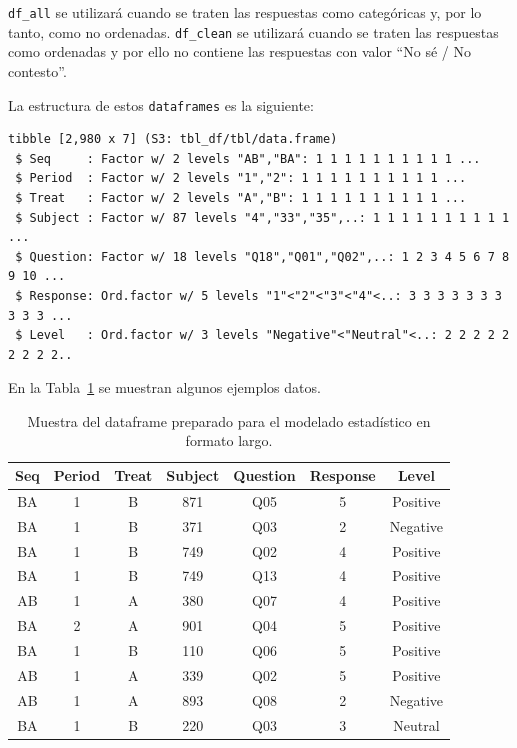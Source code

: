 \documentclass[
  12pt,
  a4paper,
  extrafontsizes,
  onecolumn,
  openright]{memoir}
\begin{document}
\texttt{df\_all} se utilizará cuando se traten las respuestas como
categóricas y, por lo tanto, como no ordenadas. \texttt{df\_clean} se
utilizará cuando se traten las respuestas como ordenadas y por ello no
contiene las respuestas con valor \enquote{No sé / No contesto}.

La estructura de estos \texttt{dataframes} es la siguiente:

\begin{verbatim}
tibble [2,980 x 7] (S3: tbl_df/tbl/data.frame)
 $ Seq     : Factor w/ 2 levels "AB","BA": 1 1 1 1 1 1 1 1 1 1 ...
 $ Period  : Factor w/ 2 levels "1","2": 1 1 1 1 1 1 1 1 1 1 ...
 $ Treat   : Factor w/ 2 levels "A","B": 1 1 1 1 1 1 1 1 1 1 ...
 $ Subject : Factor w/ 87 levels "4","33","35",..: 1 1 1 1 1 1 1 1 1 1 ...
 $ Question: Factor w/ 18 levels "Q18","Q01","Q02",..: 1 2 3 4 5 6 7 8 9 10 ...
 $ Response: Ord.factor w/ 5 levels "1"<"2"<"3"<"4"<..: 3 3 3 3 3 3 3 3 3 3 ...
 $ Level   : Ord.factor w/ 3 levels "Negative"<"Neutral"<..: 2 2 2 2 2 2 2 2 2..
\end{verbatim}

En la Tabla~\ref{tbl-df_clean} se muestran algunos ejemplos datos.

\hypertarget{tbl-df_clean}{}
\begin{longtable}{ccccccc}
\caption{\label{tbl-df_clean}Muestra del dataframe preparado para el modelado estadístico en formato
largo. }\tabularnewline

\toprule
Seq & Period & Treat & Subject & Question & Response & Level \\ 
\midrule
BA & 1 & B & 871 & Q05 & 5 & Positive \\ 
BA & 1 & B & 371 & Q03 & 2 & Negative \\ 
BA & 1 & B & 749 & Q02 & 4 & Positive \\ 
BA & 1 & B & 749 & Q13 & 4 & Positive \\ 
AB & 1 & A & 380 & Q07 & 4 & Positive \\ 
BA & 2 & A & 901 & Q04 & 5 & Positive \\ 
BA & 1 & B & 110 & Q06 & 5 & Positive \\ 
AB & 1 & A & 339 & Q02 & 5 & Positive \\ 
AB & 1 & A & 893 & Q08 & 2 & Negative \\ 
BA & 1 & B & 220 & Q03 & 3 & Neutral \\ 
\bottomrule
\end{longtable}

\end{document}
